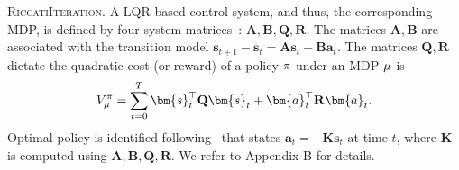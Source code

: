 \noindent\textsc{RiccatiIteration.}
A LQR-based control system, and thus, the corresponding MDP, is defined by four system matrices~\citep{kalman1960new}: $\mathbf{A}, \mathbf{B}, \mathbf{Q},\mathbf{R}$. The matrices $\mathbf{A, B}$ are associated with the transition model $\bm{s}_{t+1}-\bm{s}_t = \mathbf{A}\bm{s}_t + \mathbf{B}\bm{a}_t$. The matrices $\mathbf{Q, R}$ dictate the quadratic cost (or reward) of a policy $\pi$ under an MDP $\mu$ is
\begin{equation*}
    V_{\mdp}^\pol = \sum_{t=0}^T \bm{s}_t^\top \mathbf{Q}\bm{s}_t + \bm{a}_t^\top \mathbf{R}\bm{a}_t.
\end{equation*}
Optimal policy is identified following~\citep{willems1971least} that states $\bm{a}_t = -\mathbf{K}\bm{s}_t$ at time $t$, where $\mathbf{K}$ is computed using $\mathbf{A}, \mathbf{B}, \mathbf{Q},\mathbf{R}$. %
We refer to Appendix B for details.

